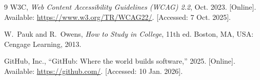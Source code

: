 \documentclass[pdftex,10pt,a4paper,oneside]{article}
\numberwithin{equation}{section} %
\begin{document}
\begin{thebibliography}{9}
W3C, \emph{Web Content Accessibility Guidelines (WCAG) 2.2}, Oct. 2023.
[Online]. Available: \url{https://www.w3.org/TR/WCAG22/}. [Accessed: 7 Oct. 2025].

W.~Pauk and R.~Owens, \emph{How to Study in College}, 11th ed. Boston, MA, USA: Cengage Learning, 2013.

GitHub, Inc., ``GitHub: Where the world builds software,'' 2025. [Online]. Available: \url{https://github.com/}. [Accessed: 10 Jan. 2026].

\end{thebibliography}


\end{document}
